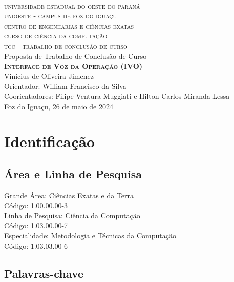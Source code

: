\documentclass[
	12pt,				%
	a4paper,			%
	english,			%
	brazil,				%
	]{article}
\begin{document}
\begin{center}

	\textsc{
		\large
			\\universidade estadual do oeste do paraná
			\\unioeste - campus de foz do iguaçu
			\\centro de engenharias e ciências exatas
			\\curso de ciência da computação
			\\[1 cm]tcc - trabalho de conclusão de curso
	}
	\\
	[4 cm]
	\large Proposta de Trabalho de Conclusão de Curso
    \\
	\textbf{
	    \textsc{Interface de Voz da Operação (IVO)}
    }
	\\[5 cm]Vinicius de Oliveira Jimenez
    \\Orientador: William Francisco da Silva
    \\Coorientadores: Filipe Ventura Muggiati e Hilton Carlos Miranda Lessa
    \\[2 cm]Foz do Iguaçu, 26 de maio de 2024
    
    
\end{center}

\thispagestyle{empty}

\section{Identificação}
    
    \subsection{Área e Linha de Pesquisa} 
    
        \noindent Grande Área: Ciências Exatas e da Terra
        \\Código: 1.00.00.00-3 
    	\\[1 cm]Linha de Pesquisa: Ciência da Computação
    	\\Código: 1.03.00.00-7
    	\\[1 cm]Especialidade: Metodologia e Técnicas da Computação
    	\\Código: 1.03.03.00-6 
    	
    	
    \subsection{Palavras-chave}
\end{document}
